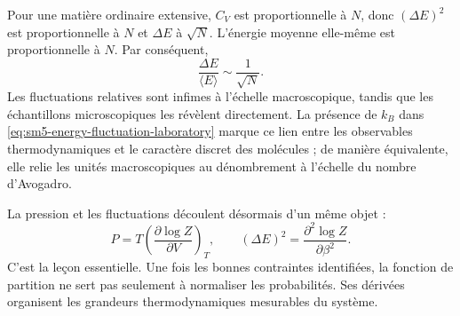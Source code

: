 \begin{classroomqa}\end{classroomqa}

Pour une matière ordinaire extensive, \(C_V\) est proportionnelle à \(N\), donc \((\Delta E)^2\) est proportionnelle à \(N\) et \(\Delta E\) à \(\sqrt{N}\). L’énergie moyenne elle-même est proportionnelle à \(N\). Par conséquent, \begin{equation}
 \frac{\Delta E}{\langle E\rangle}\sim\frac{1}{\sqrt{N}}.
 \label{eq:sm5-relative-fluctuation-scaling}
\end{equation} Les fluctuations relatives sont infimes à l’échelle macroscopique, tandis que les échantillons microscopiques les révèlent directement. La présence de \(k_B\) dans \eqref{eq:sm5-energy-fluctuation-laboratory} marque ce lien entre les observables thermodynamiques et le caractère discret des molécules ; de manière équivalente, elle relie les unités macroscopiques au dénombrement à l’échelle du nombre d’Avogadro.

La pression et les fluctuations découlent désormais d’un même objet : \[
 P=T\left(\frac{\partial\log Z}{\partial V}\right)_T,
 \qquad
 (\Delta E)^2=\frac{\partial^2\log Z}{\partial\beta^2}.
\] C’est la leçon essentielle. Une fois les bonnes contraintes identifiées, la fonction de partition ne sert pas seulement à normaliser les probabilités. Ses dérivées organisent les grandeurs thermodynamiques mesurables du système.